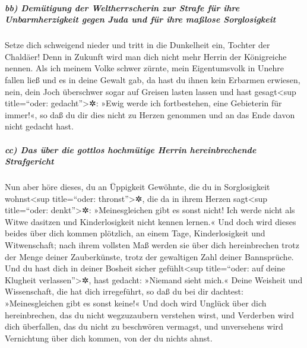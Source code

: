 \hypertarget{bb-demuxfctigung-der-weltherrscherin-zur-strafe-fuxfcr-ihre-unbarmherzigkeit-gegen-juda-und-fuxfcr-ihre-mauxdflose-sorglosigkeit}{%
\subparagraph{bb) Demütigung der Weltherrscherin zur Strafe für ihre
Unbarmherzigkeit gegen Juda und für ihre maßlose
Sorglosigkeit}\label{bb-demuxfctigung-der-weltherrscherin-zur-strafe-fuxfcr-ihre-unbarmherzigkeit-gegen-juda-und-fuxfcr-ihre-mauxdflose-sorglosigkeit}}

Setze dich schweigend nieder und tritt in die Dunkelheit
ein, Tochter der Chaldäer! Denn in Zukunft wird man dich nicht mehr
Herrin der Königreiche nennen. Als ich meinem Volke schwer
zürnte, mein Eigentumsvolk in Unehre fallen ließ und es in deine Gewalt
gab, da hast du ihnen kein Erbarmen erwiesen, nein, dein Joch überschwer
sogar auf Greisen lasten lassen und hast
gesagt\textless sup title=``oder: gedacht''\textgreater✲: »Ewig werde
ich fortbestehen, eine Gebieterin für immer!«, so daß du dir dies nicht
zu Herzen genommen und an das Ende davon nicht gedacht hast.

\hypertarget{cc-das-uxfcber-die-gottlos-hochmuxfctige-herrin-hereinbrechende-strafgericht}{%
\subparagraph{cc) Das über die gottlos hochmütige Herrin hereinbrechende
Strafgericht}\label{cc-das-uxfcber-die-gottlos-hochmuxfctige-herrin-hereinbrechende-strafgericht}}

Nun aber höre dieses, du an Üppigkeit Gewöhnte, die du in
Sorglosigkeit wohnst\textless sup title=``oder: thronst''\textgreater✲,
die da in ihrem Herzen sagt\textless sup title=``oder:
denkt''\textgreater✲: »Meinesgleichen gibt es sonst nicht! Ich werde
nicht als Witwe dasitzen und Kinderlosigkeit nicht kennen lernen.«
Und doch wird dieses beides über dich kommen plötzlich, an
einem Tage, Kinderlosigkeit und Witwenschaft; nach ihrem vollsten Maß
werden sie über dich hereinbrechen trotz der Menge deiner Zauberkünste,
trotz der gewaltigen Zahl deiner Bannsprüche. Und du hast
dich in deiner Bosheit sicher gefühlt\textless sup title=``oder: auf
deine Klugheit verlassen''\textgreater✲, hast gedacht: »Niemand sieht
mich.« Deine Weisheit und Wissenschaft, die hat dich irregeführt, so daß
du bei dir dachtest: »Meinesgleichen gibt es sonst keine!«
Und doch wird Unglück über dich hereinbrechen, das du
nicht wegzuzaubern verstehen wirst, und Verderben wird dich überfallen,
das du nicht zu beschwören vermagst, und unversehens wird Vernichtung
über dich kommen, von der du nichts ahnst.

